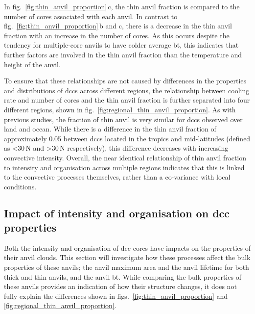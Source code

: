 In fig.~\ref{fig:thin_anvil_proportion}\,c, the thin anvil fraction is compared to the number of cores associated with each anvil.
In contrast to fig.~\ref{fig:thin_anvil_proportion}\,b and c, there is a decrease in the thin anvil fraction with an increase in the number of cores.
As this occurs despite the tendency for multiple-core anvils to have colder average \acrshort{bt}, this indicates that further factors are involved in the thin anvil fraction than the temperature and height of the anvil.

To ensure that these relationships are not caused by differences in the properties and distributions of \acrshort{dcc}s across different regions, the relationship between cooling rate and number of cores and the thin anvil fraction is further separated into four different regions, shown in fig.~\ref{fig:regional_thin_anvil_proportion}.
As with previous studies, the fraction of thin anvil is very similar for \acrshort{dcc}s observed over land and ocean.
While there is a difference in the thin anvil fraction of approximately 0.05 between \acrshort{dcc}s located in the tropics and mid-latitudes (defined as \textless 30\,\textdegree N and \textgreater 30\,\textdegree N respectively), this difference decreases with increasing convective intensity.
Overall, the near identical relationship of thin anvil fraction to intensity and organisation across multiple regions indicates that this is linked to the convective processes themselves, rather than a co-variance with local conditions.

\subsection{Impact of intensity and organisation on \acrshort{dcc} properties}

Both the intensity and organisation of \acrshort{dcc} cores have impacts on the properties of their anvil clouds.
This section will investigate how these processes affect the bulk properties of these anvils; the anvil maximum area and the anvil lifetime for both thick and thin anvils, and the anvil \acrshort{bt}.
While comparing the bulk properties of these anvils provides an indication of how their structure changes, it does not fully explain the differences shown in figs.~\ref{fig:thin_anvil_proportion} and \ref{fig:regional_thin_anvil_proportion}.

